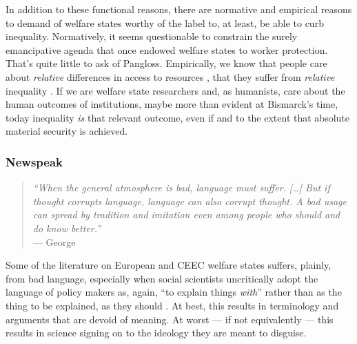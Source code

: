 \begin{enumerate}
	In addition to these functional reasons, there are normative and empirical reasons to demand of welfare states worthy of the label to, at least, be able to curb inequality. Normatively, it seems questionable to constrain the surely emancipative agenda that once endowed welfare states to worker protection. That's quite little to ask of Pangloss. Empirically, we know that people care about \emph{relative} differences in access to resources \citep{Frank2005}, that they suffer from \emph{relative} inequality \citep{Pickett-2009-kx}. If we are welfare state researchers and, as humanists, care about the human outcomes of institutions, maybe more than evident at Bismarck's time, today inequality \emph{is} that relevant outcome, even if and to the extent that absolute material security is achieved.
\end{enumerate}

\subsubsection[Newspeak]{Newspeak} \label{sec:newspeak}

\begin{quote}
	\emph{``When the general atmosphere is bad, language must suffer. [\ldots] But if thought corrupts language, language can also corrupt thought. A bad usage can spread by tradition and imitation even among people who should and do know better.''}\\
	--- George \citealt{Orwell1946}
\end{quote}

Some of the literature on European and \gls{CEEC} welfare states suffers, plainly, from bad language, especially when social scientists uncritically adopt the language of policy makers as, again, ``to explain things \emph{with}'' rather than as the thing to be explained, as they should \citep{Brubaker-2002-aa}. At best, this results in terminology and arguments that are devoid of meaning. At worst --- if not equivalently --- this results in science signing on to the ideology they are meant to disguise.



